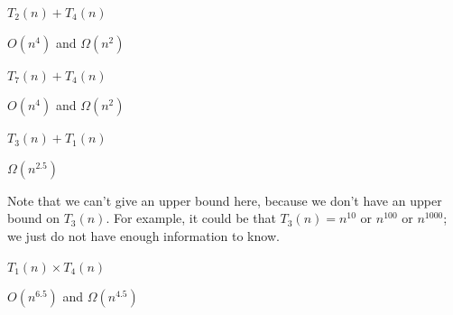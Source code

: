 \begin{prob}
\begin{subprobset}
        \begin{subprob}
            $T_2(n) + T_4(n)$

            \begin{soln}
                $O(n^4)$ and $\Omega(n^2)$
            \end{soln}
        \end{subprob}

        \begin{subprob}
            $T_7(n) + T_4(n)$

            \begin{soln}
                $O(n^4)$ and $\Omega(n^2)$
            \end{soln}
        \end{subprob}

        \begin{subprob}
            $T_3(n) + T_1(n)$

            \begin{soln}
                $\Omega(n^{2.5})$

                Note that we can't give an upper bound here, because we don't have an upper
                bound on $T_3(n)$. For example, it could be that $T_3(n) = n^{10}$ or
                $n^{100}$ or $n^{1000}$; we just do not have enough information to know.
            \end{soln}
        \end{subprob}

        \begin{subprob}
            $T_1(n) \times T_4(n)$

            \begin{soln}
                $O(n^{6.5})$ and $\Omega(n^{4.5})$

            \end{soln}
        \end{subprob}

    \end{subprobset}

\end{prob}

